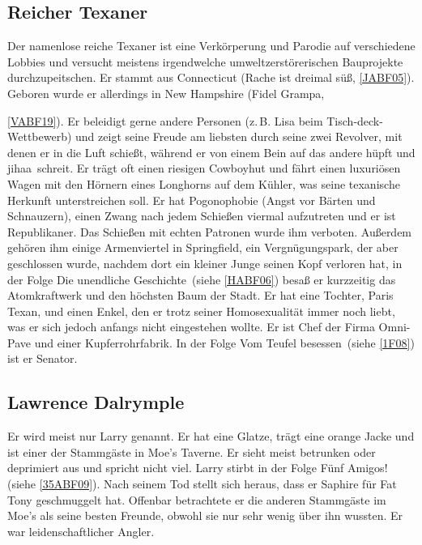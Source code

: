 {\subsection{Reicher Texaner}\label{ReicherTexaner}
Der namenlose reiche Texaner ist eine Verkörperung und Parodie auf verschiedene Lobbies und versucht meistens irgendwelche umweltzerstörerischen Bauprojekte durchzupeitschen. Er stammt aus Connecticut (\glqq Rache ist dreimal süß\grqq , \ref{JABF05}). Geboren wurde er allerdings in New Hampshire (\glqq Fidel Grampa\grqq, }\ref{VABF19}). Er beleidigt gerne andere Personen (z.\,B. Lisa beim Tisch-deck-Wettbewerb) und zeigt seine Freude am liebsten durch seine zwei Revolver, mit denen er in die Luft schießt, während er von einem Bein auf das andere hüpft und \glqq jihaa\grqq\ schreit. Er trägt oft einen riesigen Cowboyhut und fährt einen luxuriösen Wagen mit den Hörnern eines Longhorns auf dem Kühler, was seine texanische Herkunft unterstreichen soll. Er hat Pogonophobie (Angst vor Bärten und Schnauzern), einen Zwang nach jedem Schießen viermal aufzutreten und er ist Republikaner. Das Schießen mit echten Patronen wurde ihm verboten. Außerdem gehören ihm einige Armenviertel in Springfield, ein Vergnügungspark, der aber geschlossen wurde, nachdem dort ein kleiner Junge seinen Kopf verloren hat, in der Folge \glqq Die unendliche Geschichte\grqq\ (siehe \ref{HABF06}) besaß er kurzzeitig das Atomkraftwerk und den höchsten Baum der Stadt. Er hat eine Tochter, Paris Texan, und einen Enkel, den er trotz seiner Homosexualität immer noch liebt, was er sich jedoch anfangs nicht eingestehen wollte. Er ist Chef der Firma Omni-Pave und einer Kupferrohrfabrik. In der Folge \glqq Vom Teufel besessen\grqq\ (siehe \ref{1F08}) ist er Senator.

\subsection{Lawrence Dalrymple}\label{LawrenceDalrymple}
Er wird meist nur Larry genannt. Er hat eine Glatze, trägt eine orange Jacke und ist einer der Stammgäste in Moe's Taverne. Er sieht meist betrunken oder deprimiert aus und spricht nicht viel. Larry stirbt in der Folge \glqq Fünf Amigos!\grqq (siehe \ref{35ABF09}). Nach seinem Tod stellt sich heraus, dass er Saphire für Fat Tony geschmuggelt hat. Offenbar betrachtete er die anderen Stammgäste im Moe's als seine besten Freunde, obwohl sie nur sehr wenig über ihn wussten. Er war leidenschaftlicher Angler.



